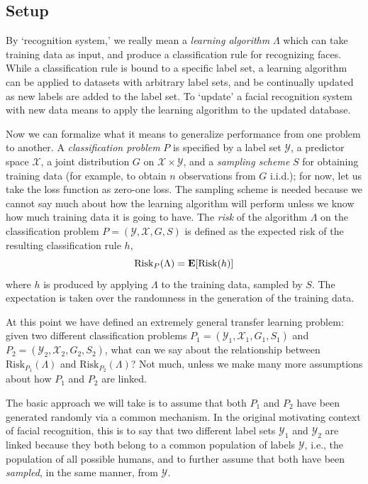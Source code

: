 \subsection{Setup}
By `recognition system,' we really mean a \emph{learning algorithm}
$\Lambda$ which can take training data as input, and produce a
classification rule for recognizing faces.  While a classification
rule is bound to a specific label set, a learning algorithm can be
applied to datasets with arbitrary label sets, and be continually
updated as new labels are added to the label set.  To `update' a
facial recognition system with new data means to apply the learning
algorithm to the updated database.

Now we can formalize what it means to generalize performance from one
problem to another.  A \emph{classification problem} $P$ is specified
by a label set $\mathcal{Y}$, a predictor space $\mathcal{X}$, a joint
distribution $G$ on $\mathcal{X} \times \mathcal{Y}$, and a
\emph{sampling scheme} $S$ for obtaining training data (for example,
to obtain $n$ observations from $G$ i.i.d.); for now, let us take the
loss function as zero-one loss.  The sampling scheme is needed because
we cannot say much about how the learning algorithm will perform
unless we know how much training data it is going to have.  The
\emph{risk} of the algorithm $\Lambda$ on the classification problem
$P = (\mathcal{Y}, \mathcal{X}, G, S)$ is defined as the expected risk
of the resulting classification rule $h$,
\[
\text{Risk}_P(\Lambda) = \textbf{E}[\text{Risk}(h)]
\]
where $h$ is produced by applying $\Lambda$ to the training data,
sampled by $S$.  The expectation is taken over the randomness in the
generation of the training data.

At this point we have defined an extremely general transfer learning
problem: given two different classification problems $P_1 =
(\mathcal{Y}_1, \mathcal{X}_1, G_1, S_1)$ and $P_2 = (\mathcal{Y}_2,
\mathcal{X}_2, G_2, S_2)$, what can we say about the relationship
between $\text{Risk}_{P_1}(\Lambda)$ and $\text{Risk}_{P_2}(\Lambda)$?
Not much, unless we make many more assumptions about how $P_1$ and
$P_2$ are linked.  

The basic approach we will take is to assume that both $P_1$ and $P_2$
have been generated randomly via a common mechanism.  In the original
motivating context of facial recognition, this is to say that two
different label sets $\mathcal{Y}_1$ and $\mathcal{Y}_2$ are linked
because they both belong to a common population of labels
$\mathcal{Y}$, i.e., the population of all possible humans, and to
further assume that both have been \emph{sampled}, in the same manner,
from $\mathcal{Y}$.

